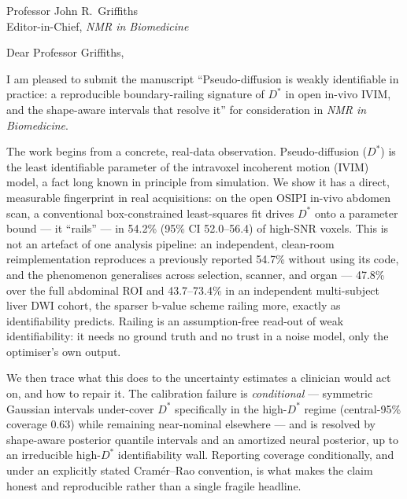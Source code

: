 \documentclass[11pt]{letter}
\begin{document}
\begin{letter}{Professor John R.\ Griffiths \\ Editor-in-Chief, \textit{NMR in Biomedicine}}

\opening{Dear Professor Griffiths,}

I am pleased to submit the manuscript ``Pseudo-diffusion is weakly identifiable in
practice: a reproducible boundary-railing signature of $D^{*}$ in open in-vivo IVIM, and
the shape-aware intervals that resolve it'' for consideration in \textit{NMR in
Biomedicine}.

The work begins from a concrete, real-data observation. Pseudo-diffusion ($D^{*}$) is the
least identifiable parameter of the intravoxel incoherent motion (IVIM) model, a fact
long known in principle from simulation. We show it has a direct, measurable fingerprint
in real acquisitions: on the open OSIPI in-vivo abdomen scan, a conventional
box-constrained least-squares fit drives $D^{*}$ onto a parameter bound --- it
``rails'' --- in 54.2\% (95\% CI 52.0--56.4) of high-SNR voxels. This is not an artefact
of one analysis pipeline: an independent, clean-room reimplementation reproduces a
previously reported 54.7\% without using its code, and the phenomenon generalises across
selection, scanner, and organ --- 47.8\% over the full abdominal ROI and 43.7--73.4\% in
an independent multi-subject liver DWI cohort, the sparser b-value scheme railing more,
exactly as identifiability predicts. Railing is an assumption-free read-out of weak
identifiability: it needs no ground truth and no trust in a noise model, only the
optimiser's own output.

We then trace what this does to the uncertainty estimates a clinician would act on, and
how to repair it. The calibration failure is \emph{conditional} --- symmetric Gaussian
intervals under-cover $D^{*}$ specifically in the high-$D^{*}$ regime (central-95\%
coverage 0.63) while remaining near-nominal elsewhere --- and is resolved by shape-aware
posterior quantile intervals and an amortized neural posterior, up to an irreducible
high-$D^{*}$ identifiability wall. Reporting coverage conditionally, and under an
explicitly stated Cram\'er--Rao convention, is what makes the claim honest and
reproducible rather than a single fragile headline.


\end{letter}
\end{document}
